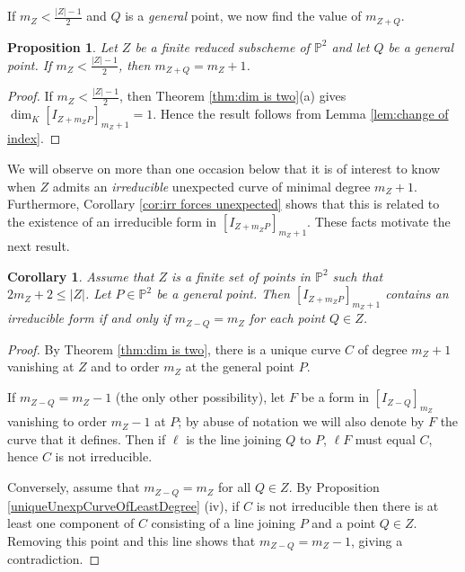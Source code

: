 \documentclass[12pt]{amsart}
\numberwithin{equation}{section}
\newtheorem{proposition}[theorem]{Proposition}
\newtheorem{corollary}[theorem]{Corollary}
\theoremstyle{definition}
\begin{document}
If  $m_Z < \frac{|Z|-1}{2}$ and $Q$ is a \emph{general} point,  we now find the value of $m_{Z+Q}$.

\begin{proposition} \label{conj:change of dZ}
Let $Z$ be a finite reduced subscheme of ${ \ensuremath{\mathbb{P}}}^2$ and let $Q$ be a general point.
If $m_{Z} < \frac{|Z| - 1}{2}$, then $m_{Z + Q} = m_Z + 1$.
\end{proposition}

\begin{proof}
If $m_{Z} < \frac{|Z| - 1}{2}$, then Theorem \ref{thm:dim is two}(a) gives $\dim_K [I_{Z + m_Z P}]_{m_Z + 1} = 1$. Hence the result follows from Lemma \ref{lem:change of index}. 
\end{proof}

 We will  observe on more than one occasion below that it is of interest to know when $Z$ admits an {\em irreducible} unexpected curve of minimal degree $m_Z+1$. Furthermore,  Corollary \ref{cor:irr forces unexpected} shows that  this is related to the  existence of an irreducible form in $[I_{Z+m_ZP}]_{m_Z+1}$. 
 These facts motivate the next result. 

\begin{corollary} 
       \label{irred curve least deg}
Assume that $Z$ is a finite set of points in $\mathbb P^2$ such that $2 m_Z + 2 \le |Z|$. Let $P \in { \ensuremath{\mathbb{P}}}^2$ be a general point.   Then $[I_{Z+m_ZP}]_{m_Z+1}$ contains an  irreducible form  if and only if $m_{Z - Q} = m_Z$ for each point $Q \in Z$.
\end{corollary}

\begin{proof}
By Theorem \ref{thm:dim is two},  there is a unique curve $C$ of degree $m_Z+1$ vanishing at $Z$ and to order $m_Z$  at the general point $P$.   

If $m_{Z-Q} = m_Z -1$ (the only other possibility), let $F$ be a form in $[I_{Z-Q}]_{m_Z}$ vanishing to order $m_Z -1$ at  $P$; by abuse of notation we will also denote by $F$ the curve that it defines. Then if $\ell$ is the line joining $Q$ to $P$, $\ell  F$ must equal $C$, hence $C$ is not irreducible.

Conversely, assume that $m_{Z-Q} = m_Z$ for all $Q \in Z$. By Proposition \ref{uniqueUnexpCurveOfLeastDegree} (iv), if $C$ is not irreducible then there is at least one component of $C$ consisting of a line joining $P$ and a point $Q \in Z$. Removing this point and this line shows that $m_{Z-Q} = m_Z -1$, giving a contradiction.
\end{proof}
\end{document}
